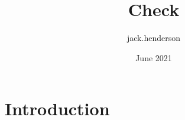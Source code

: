 \documentclass{article}
\title{Check}
\author{jack.henderson }
\date{June 2021}
\begin{document}
\maketitle

\section{Introduction}
\end{document}

